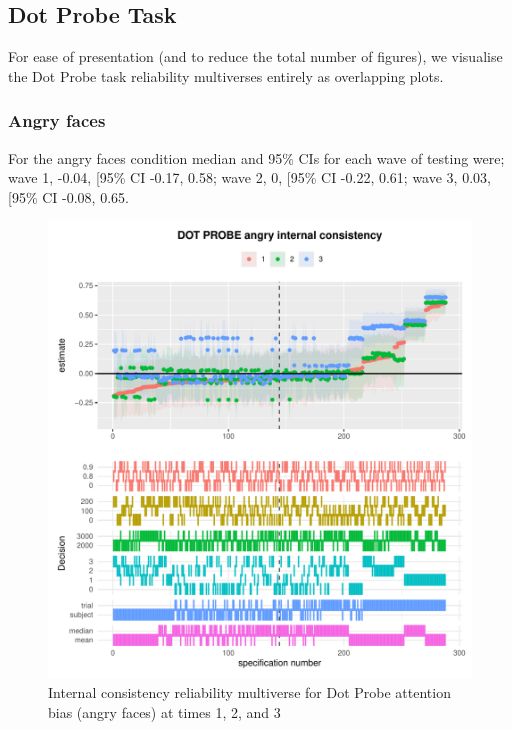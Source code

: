 \documentclass[
  english,
  man,floatsintext]{apa6}
\begin{document}
\hypertarget{dot-probe-task-1}{%
\subsection{Dot Probe Task}\label{dot-probe-task-1}}

For ease of presentation (and to reduce the total number of figures), we visualise the Dot Probe task reliability multiverses entirely as overlapping plots.

\hypertarget{angry-faces}{%
\subsubsection{Angry faces}\label{angry-faces}}

For the angry faces condition median and 95\% CIs for each wave of testing were; wave 1, -0.04, {[}95\% CI -0.17, 0.58; wave 2, 0, {[}95\% CI -0.22, 0.61; wave 3, 0.03, {[}95\% CI -0.08, 0.65.

\begin{figure}
\centering
\includegraphics{Reliability_Multiverse_files/figure-latex/unnamed-chunk-13-1.pdf}
\caption{\label{fig:unnamed-chunk-13}Internal consistency reliability multiverse for Dot Probe attention bias (angry faces) at times 1, 2, and 3}
\end{figure}
\end{document}
